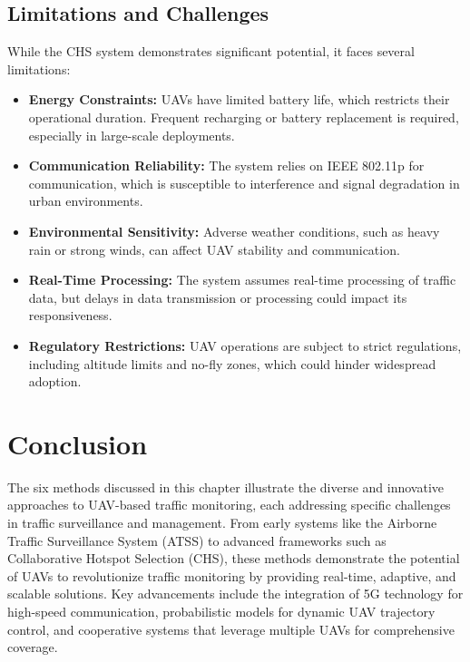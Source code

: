 \subsection{Limitations and Challenges}
While the CHS system demonstrates significant potential, it faces several limitations:
\begin{itemize}
    \item \textbf{Energy Constraints:} UAVs have limited battery life, which restricts their operational duration. Frequent recharging or battery replacement is required, especially in large-scale deployments.
    \item \textbf{Communication Reliability:} The system relies on IEEE 802.11p for communication, which is susceptible to interference and signal degradation in urban environments.
    \item \textbf{Environmental Sensitivity:} Adverse weather conditions, such as heavy rain or strong winds, can affect UAV stability and communication.
    \item \textbf{Real-Time Processing:} The system assumes real-time processing of traffic data, but delays in data transmission or processing could impact its responsiveness.
    \item \textbf{Regulatory Restrictions:} UAV operations are subject to strict regulations, including altitude limits and no-fly zones, which could hinder widespread adoption.
\end{itemize}

\vspace{\baselineskip} %




\section{Conclusion}

The six methods discussed in this chapter illustrate the diverse and innovative approaches to UAV-based traffic monitoring, each addressing specific challenges in traffic surveillance and management. From early systems like the Airborne Traffic Surveillance System (ATSS) to advanced frameworks such as Collaborative Hotspot Selection (CHS), these methods demonstrate the potential of UAVs to revolutionize traffic monitoring by providing real-time, adaptive, and scalable solutions. Key advancements include the integration of 5G technology for high-speed communication, probabilistic models for dynamic UAV trajectory control, and cooperative systems that leverage multiple UAVs for comprehensive coverage.

